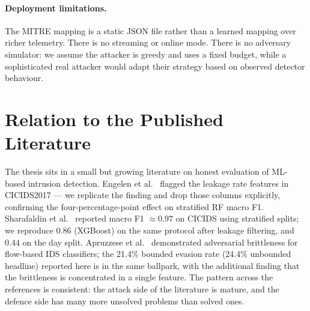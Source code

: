 \paragraph{Deployment limitations.} The MITRE mapping is a static JSON
file rather than a learned mapping over richer telemetry. There is no
streaming or online mode. There is no adversary simulator: we assume
the attacker is greedy and uses a fixed budget, while a sophisticated
real attacker would adapt their strategy based on observed detector
behaviour.

\section{Relation to the Published Literature}

The thesis sits in a small but growing literature on honest evaluation
of ML-based intrusion detection. Engelen et al.~\cite{Engelen2021}
flagged the leakage rate features in CICIDS2017 --- we replicate the
finding and drop those columns explicitly, confirming the
four-percentage-point effect on stratified RF macro F1. Sharafaldin et
al.~\cite{Sharafaldin2018} reported macro F1 $\approx 0.97$ on CICIDS
using stratified splits; we reproduce 0.86 (XGBoost) on the same
protocol after leakage filtering, and 0.44 on the day split. Apruzzese
et al.~\cite{Apruzzese2019} demonstrated adversarial brittleness for
flow-based IDS classifiers; the 21.4\% bounded evasion rate
(24.4\% unbounded headline) reported here is in the same ballpark, with
the additional finding that the brittleness is concentrated in a single
feature. The pattern across the references is consistent: the attack
side of the literature is mature, and the defence side has many more
unsolved problems than solved ones.

